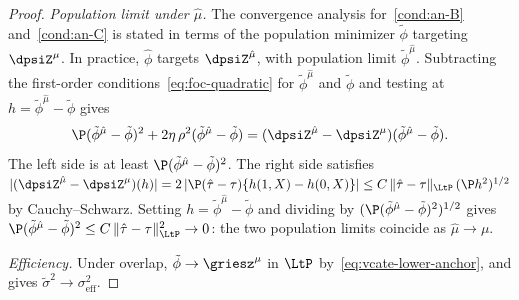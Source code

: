 \documentclass{article}
\begin{document}
\begin{proof}
\emph{Population limit under $\hat\mu$.}
The convergence analysis for~\ref{cond:an-B} and~\ref{cond:an-C}
is stated in terms of the population minimizer
$\tilde\phi$ targeting $\dpsiZ^\mu$.
In practice, $\hat\phi$ targets $\dpsiZ^{\hat\mu}$,
with population limit $\tilde\phi^{\hat\mu}$.
Subtracting the first-order conditions~\eqref{eq:foc-quadratic}
for $\tilde\phi^{\hat\mu}$ and $\tilde\phi$
and testing at $h = \tilde\phi^{\hat\mu} - \tilde\phi$ gives
\[
\P(\tilde\phi^{\hat\mu} - \tilde\phi)^2
  + 2\eta\,\rho^2(\tilde\phi^{\hat\mu} - \tilde\phi)
  = (\dpsiZ^{\hat\mu} - \dpsiZ^\mu)
    (\tilde\phi^{\hat\mu} - \tilde\phi).
\]
The left side is at least
$\P(\tilde\phi^{\hat\mu} - \tilde\phi)^2$.
The right side satisfies
$|(\dpsiZ^{\hat\mu} - \dpsiZ^\mu)(h)|
  = 2\,|\P(\hat\tau - \tau)\{h(1,X) - h(0,X)\}|
  \le C\,\|\hat\tau - \tau\|_{\LtP}\,
      (\P h^2)^{1/2}$
by Cauchy--Schwarz.
Setting $h = \tilde\phi^{\hat\mu} - \tilde\phi$
and dividing by
$(\P(\tilde\phi^{\hat\mu} - \tilde\phi)^2)^{1/2}$
gives
$\P(\tilde\phi^{\hat\mu} - \tilde\phi)^2
  \le C\,\|\hat\tau - \tau\|_{\LtP}^2 \to 0$:
the two population limits coincide
as $\hat\mu \to \mu$.

\emph{Efficiency.}
Under overlap,
$\tilde\phi \to \griesz^\mu$ in $\LtP$
by~\eqref{eq:vcate-lower-anchor},
and 
gives $\tilde\sigma^2 \to \sigma^2_{\mathrm{eff}}$.
\end{proof}
\end{document}
